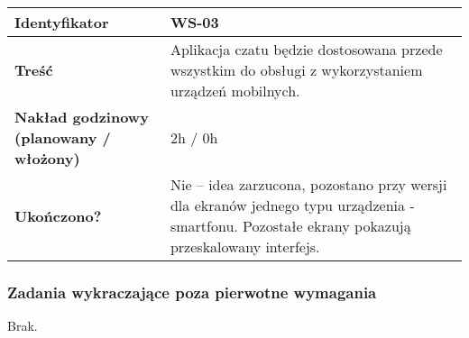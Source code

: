 \begin{tabular}{ | l | l | }
	\hline
		\textbf{Identyfikator} &
	WS-03
		\\

	\hline
		\textbf{Treść} & \parbox[t]{11.5cm}{
			Aplikacja czatu będzie dostosowana przede wszystkim
			do obsługi z wykorzystaniem urządzeń mobilnych.
		}\\

	\hline      \parbox[t]{4cm}{\textbf{Nakład godzinowy (planowany / włożony)}} &
        \parbox[t]{11.5cm}{\strut
          2h / 0h
        \strut}\\

        \hline
          \parbox[t]{4cm}{\textbf{Ukończono?}} &
          \parbox[t]{11.5cm}{\strut
            Nie -- idea zarzucona, pozostano przy wersji dla ekranów
						jednego typu urządzenia - smartfonu. Pozostałe ekrany pokazują
						przeskalowany interfejs.
          \strut}\\
  	\hline
\end{tabular}

\subsubsection{Zadania wykraczające poza pierwotne wymagania}

Brak.
